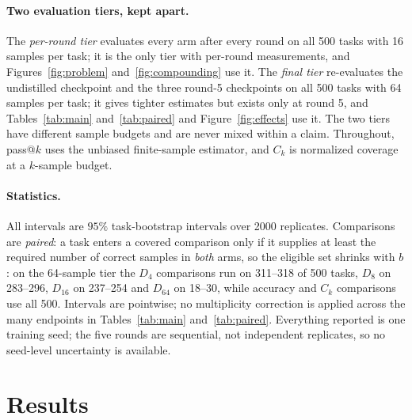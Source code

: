 \documentclass{article}
\begin{document}
\paragraph{Two evaluation tiers, kept apart.} The \emph{per-round tier} evaluates every arm after every round on all 500 tasks with 16 samples per task; it is the only tier with per-round measurements, and Figures~\ref{fig:problem} and~\ref{fig:compounding} use it. The \emph{final tier} re-evaluates the undistilled checkpoint and the three round-5 checkpoints on all 500 tasks with 64 samples per task; it gives tighter estimates but exists only at round 5, and Tables~\ref{tab:main} and~\ref{tab:paired} and Figure~\ref{fig:effects} use it. The two tiers have different sample budgets and are never mixed within a claim. Throughout, pass@$k$ uses the unbiased finite-sample estimator, and $C_k$ is normalized coverage at a $k$-sample budget.

\paragraph{Statistics.} All intervals are $95\%$ task-bootstrap intervals over 2000 replicates. Comparisons are \emph{paired}: a task enters a covered comparison only if it supplies at least the required number of correct samples in \emph{both} arms, so the eligible set shrinks with $b$: on the 64-sample tier the $D_4$ comparisons run on 311--318 of 500 tasks, $D_8$ on 283--296, $D_{16}$ on 237--254 and $D_{64}$ on 18--30, while accuracy and $C_k$ comparisons use all 500. Intervals are pointwise; no multiplicity correction is applied across the many endpoints in Tables~\ref{tab:main} and~\ref{tab:paired}. Everything reported is one training seed; the five rounds are sequential, not independent replicates, so no seed-level uncertainty is available.

\section{Results}
\label{sec:results}
\end{document}
